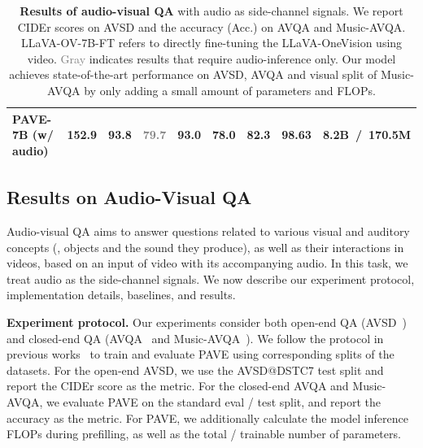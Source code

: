 \begin{table}[t]
{\begin{tabular}{lc|c|cccc|c|c}
     PAVE-7B   (w/ audio)                                          & \textbf{152.9} & \textbf{93.8} & \textcolor{gray}{79.7} & \textbf{93.0} & 78.0 &  82.3 & 98.63 & 8.2B~/~170.5M \\ \bottomrule

\end{tabular}
}
\vspace{-1mm}
\caption{\textbf{Results of audio-visual QA} with audio as side-channel signals. We report CIDEr scores on AVSD and the accuracy (Acc.) on AVQA and Music-AVQA. LLaVA-OV-7B-FT refers to directly fine-tuning the LLaVA-OneVision using video. \textcolor{gray}{Gray} indicates results that require audio-inference only. Our model achieves state-of-the-art performance on AVSD, AVQA and visual split of Music-AVQA by only adding a small amount of parameters and FLOPs.
\vspace{-4mm}
}  
\label{tab:video_audio_understanding}  
\end{table}  

\subsection{Results on Audio-Visual QA} \label{section_res_audio}

Audio-visual QA aims to answer questions related to various visual and auditory concepts (\eg, objects and the sound they produce), as well as their interactions in videos, based on an input of video with its accompanying audio. In this task, we treat audio as the side-channel signals. We now describe our experiment protocol, implementation details, baselines, and results. 



\medskip
\noindent\textbf{Experiment protocol.} Our experiments consider both open-end QA (AVSD~\cite{alamri2019audiovisualsceneawaredialog}) and closed-end QA (AVQA~\cite{yang2022avqa} and Music-AVQA~\cite{Li2022Learning}). We follow the protocol in previous works~\cite{ye2024catenhancingmultimodallarge, pham2022videodialogconversationobjects} to train and evaluate PAVE using corresponding splits of the datasets. For the open-end AVSD, we use the AVSD@DSTC7 test split and report the CIDEr score as the metric. For the closed-end AVQA and Music-AVQA, we evaluate PAVE on the standard eval / test split, and report the accuracy as the metric. For PAVE, we additionally calculate the model inference FLOPs during prefilling, as well as the total / trainable number of parameters. 

